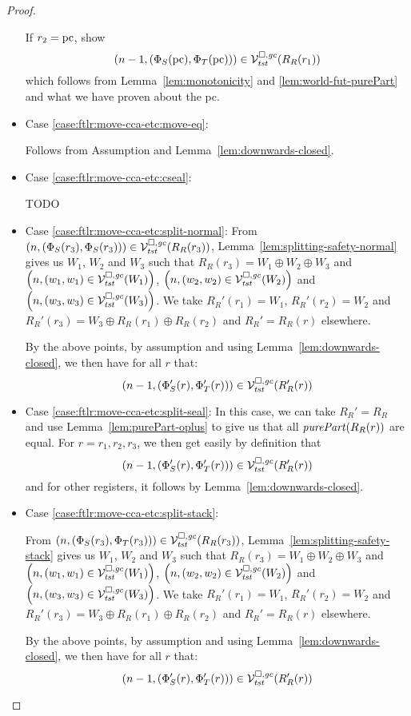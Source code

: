 \begin{proof}
\begin{itemize}
    If $r_2 = \pcreg$, show
    \[
      \npair[n-1]{(\Phi_S(\pcreg),\Phi_T(\pcreg))} \in \lrvg{\trust}(R_R(r_1))
    \]
    which follows from Lemma~\ref{lem:monotonicity} and \ref{lem:world-fut-purePart} and what we have proven about the pc.
  \item Case \ref{case:ftlr:move-cca-etc:move-eq}:
    
    Follows from Assumption and Lemma~\ref{lem:downwards-closed}.

  \item Case \ref{case:ftlr:move-cca-etc:cseal}:

    TODO
  \item Case \ref{case:ftlr:move-cca-etc:split-normal}:
    From $\npair{(\Phi_S(r_3),\Phi_S(r_3))} \in \lrvg{\trust}(R_R(r_3))$, Lemma~\ref{lem:splitting-safety-normal} gives us $W_1$, $W_2$ and $W_3$ such that $R_R(r_3) = W_1 \oplus W_2 \oplus W_3$ and $\npair{(w_1,w_1) \in \lrvg{\trust}(W_1)}$, $\npair{(w_2,w_2) \in \lrvg{\trust}(W_2)}$ and $\npair{(w_3,w_3) \in \lrvg{\trust}(W_3)}$.
    We take $R_R'(r_1) = W_1$, $R_R'(r_2) = W_2$ and $R_R'(r_3) = W_3 \oplus R_R(r_1) \oplus R_R(r_2)$ and $R_R' = R_R(r)$ elsewhere.

    By the above points, by assumption and using Lemma~\ref{lem:downwards-closed}, we then have for all $r$ that:
    \[
      \npair[n-1]{(\Phi_S'(r), \Phi_T'(r))} \in \lrvg{\trust}(R_R'(r))
    \]
  \item Case \ref{case:ftlr:move-cca-etc:split-seal}:
    In this case, we can take $R_R' = R_R$ and use Lemma~\ref{lem:purePart-oplus} to give us that all $\purePart{R_R(r)}$ are equal.
    For $r = r_1, r_2, r_3$, we then get easily by definition that
    \[
      \npair[n-1]{(\Phi_S'(r), \Phi_T'(r))} \in \lrvg{\trust}(R_R'(r))
    \]
    and for other registers, it follows by Lemma~\ref{lem:downwards-closed}.

  \item Case \ref{case:ftlr:move-cca-etc:split-stack}:

    From $\npair{(\Phi_S(r_3),\Phi_T(r_3))} \in \lrvg{\trust}(R_R(r_3))$, Lemma~\ref{lem:splitting-safety-stack} gives us $W_1$, $W_2$ and $W_3$ such that $R_R(r_3) = W_1 \oplus W_2 \oplus W_3$ and $\npair{(w_1,w_1) \in \lrvg{\trust}(W_1)}$, $\npair{(w_2,w_2) \in \lrvg{\trust}(W_2)}$ and $\npair{(w_3,w_3) \in \lrvg{\trust}(W_3)}$.
    We take $R_R'(r_1) = W_1$, $R_R'(r_2) = W_2$ and $R_R'(r_3) = W_3 \oplus R_R(r_1) \oplus R_R(r_2)$ and $R_R' = R_R(r)$ elsewhere.

    By the above points, by assumption and using Lemma~\ref{lem:downwards-closed}, we then have for all $r$ that:
    \[
      \npair[n-1]{(\Phi_S'(r), \Phi_T'(r))} \in \lrvg{\trust}(R_R'(r))
    \]


\end{itemize}
\end{proof}
